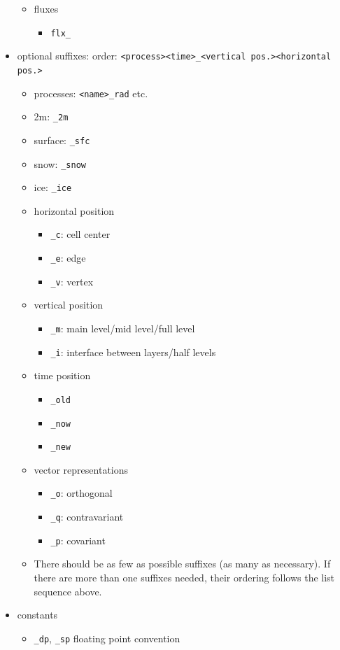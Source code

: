 \documentclass[a4paper,11pt,DIV16,BCOR1cm,titlepage]{scrartcl}
\begin{document}
\begin{itemize}
\begin{itemize}
\item fluxes
\begin{itemize}
\item \texttt{flx\_}
\end{itemize}
\end{itemize}

\item optional suffixes: order: \texttt{<process><time>\_<vertical pos.><horizontal pos.>}
\begin{itemize}
\item processes: \texttt{<name>\_rad} etc.
\item 2m: \texttt{\_2m}
\item surface: \texttt{\_sfc}
\item snow: \texttt{\_snow}
\item ice: \texttt{\_ice}
\item horizontal position
\begin{itemize}
\item \texttt{\_c}: cell center
\item \texttt{\_e}: edge
\item \texttt{\_v}: vertex
\end{itemize}

\item vertical position
\begin{itemize}
\item \texttt{\_m}: main level/mid level/full level
\item \texttt{\_i}: interface between layers/half levels
\end{itemize}

\item time position
\begin{itemize}
\item \texttt{\_old}
\item \texttt{\_now}
\item \texttt{\_new}
\end{itemize}

\item vector representations
\begin{itemize}
\item \texttt{\_o}: orthogonal
\item \texttt{\_q}: contravariant
\item \texttt{\_p}: covariant
\end{itemize}

\item There should be as few as possible suffixes (as many as necessary). If there are 
more than one suffixes needed, their ordering follows the list sequence above.

\end{itemize}

\item constants
\begin{itemize}
\item \texttt{\_dp}, \texttt{\_sp} floating point convention
\end{itemize}

\end{itemize}
\end{document}
